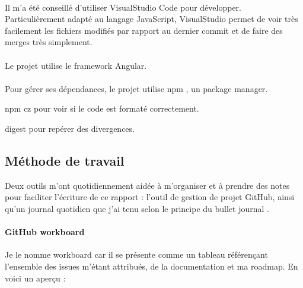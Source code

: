\documentclass[12pt]{article}
\begin{document}
\paragraph{}
Il m'a été conseillé d'utiliser VisualStudio Code pour développer. Particulièrement adapté au langage JavaScript, VisualStudio permet de voir très facilement les fichiers modifiés par rapport au dernier commit et de faire des merges très simplement.

\paragraph{}
Le projet utilise le framework Angular.

\paragraph{}
Pour gérer ses dépendances, le projet utilise npm \cite{npm}, un package manager.

npm cz pour voir si le code est formaté correctement.

digest pour repérer des divergences.\\

\subsection{Méthode de travail}
Deux outils m'ont quotidiennement aidée à m'organiser et à prendre des notes pour faciliter l'écriture de ce rapport : l'outil de gestion de projet GitHub, ainsi qu'un journal quotidien que j'ai tenu selon le principe du bullet journal \cite{bullet}.

\paragraph{GitHub workboard}
Je le nomme workboard car il se présente comme un tableau référençant l'ensemble des issues m'étant attribués, de la documentation et ma roadmap. En voici un aperçu :
\end{document}
